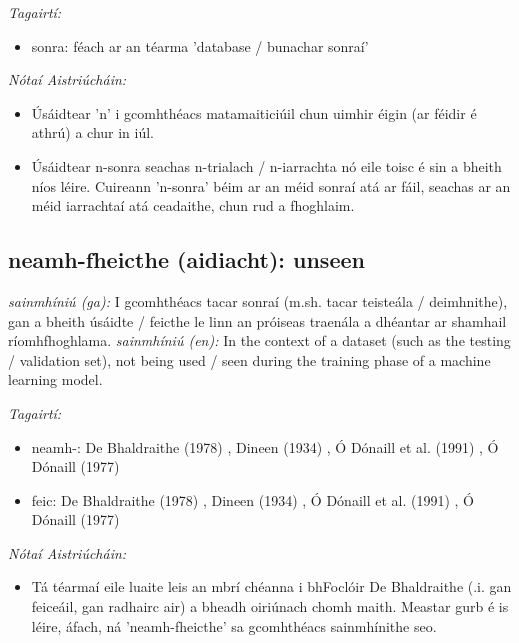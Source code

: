 \documentclass{article}
\begin{document}
 \noindent \textit{Tagairtí:}
\begin{itemize}
	\item sonra: féach ar an téarma 'database / bunachar sonraí'
\end{itemize}

 \noindent \textit{Nótaí Aistriúcháin:}
\begin{itemize}
	\item Úsáidtear 'n' i gcomhthéacs matamaiticiúil chun uimhir éigin (ar féidir é athrú) a chur in iúl.
	\item Úsáidtear n-sonra seachas n-trialach / n-iarrachta nó eile toisc é sin a bheith níos léire. Cuireann 'n-sonra' béim ar an méid sonraí atá ar fáil, seachas ar an méid iarrachtaí atá ceadaithe, chun rud a fhoghlaim.
\end{itemize}


\subsection*{neamh-fheicthe (aidiacht): unseen} 
 \noindent \textit{sainmhíniú (ga):} I gcomhthéacs tacar sonraí (m.sh. tacar teisteála / deimhnithe), gan a bheith úsáidte / feicthe le linn an próiseas traenála a dhéantar ar shamhail ríomhfhoghlama.
\newline\newline
 \noindent \textit{sainmhíniú (en):} In the context of a dataset (such as the testing / validation set), not being used / seen during the training phase of a machine learning model.
\newline

 \noindent \textit{Tagairtí:}
\begin{itemize}
	\item neamh-: De Bhaldraithe (1978) \cite{de-bhaldraithe}, Dineen (1934) \cite{dineen}, Ó Dónaill et al. (1991) \cite{focloir-beag}, Ó Dónaill (1977) \cite{odonaill}
	\item feic: De Bhaldraithe (1978) \cite{de-bhaldraithe}, Dineen (1934) \cite{dineen}, Ó Dónaill et al. (1991) \cite{focloir-beag}, Ó Dónaill (1977) \cite{odonaill}
\end{itemize}

 \noindent \textit{Nótaí Aistriúcháin:}
\begin{itemize}
	\item Tá téarmaí eile luaite leis an mbrí chéanna i bhFoclóir De Bhaldraithe (.i. gan feiceáil, gan radhairc air) a bheadh oiriúnach chomh maith. Meastar gurb é is léire, áfach, ná 'neamh-fheicthe' sa gcomhthéacs sainmhínithe seo.
\end{itemize}
\end{document}
